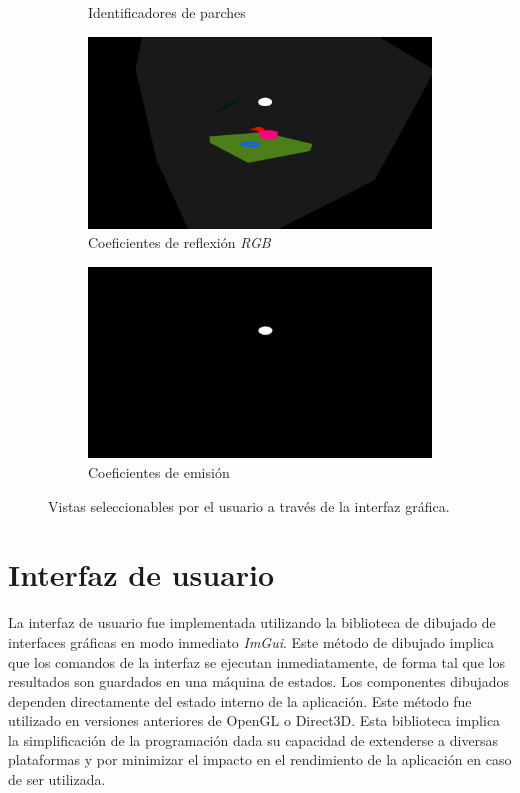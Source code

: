 \begin{figure}[htbp!]
\begin{subfigure}{0.4\textwidth}
		\caption{Identificadores de parches}
	\end{subfigure}
	\begin{subfigure}{0.4\textwidth}
		\includegraphics[width=1\linewidth]{assets/display-view(2)}
		\caption{Coeficientes de reflexión \textit{RGB}}
	\end{subfigure}
	\begin{subfigure}{0.4\textwidth}
		\includegraphics[width=1\linewidth]{assets/display-view(5)}
		\caption{Coeficientes de emisión}
	\end{subfigure}
	\caption{Vistas seleccionables por el usuario a través de la interfaz gráfica.}
	\label{img:displayed}
\end{figure}

\section {Interfaz de usuario}

La interfaz de usuario fue implementada utilizando la biblioteca de dibujado de interfaces gráficas en modo inmediato \textit{ImGui}. Este método de dibujado implica que los comandos de  la interfaz se ejecutan inmediatamente, de forma tal que los resultados son guardados en una máquina de estados. Los componentes dibujados dependen directamente del estado interno de la aplicación. Este método fue utilizado en versiones anteriores de OpenGL o Direct3D. Esta biblioteca implica la simplificación de la programación dada su capacidad de extenderse a diversas plataformas y por minimizar el impacto en el rendimiento de la aplicación en caso de ser utilizada.

